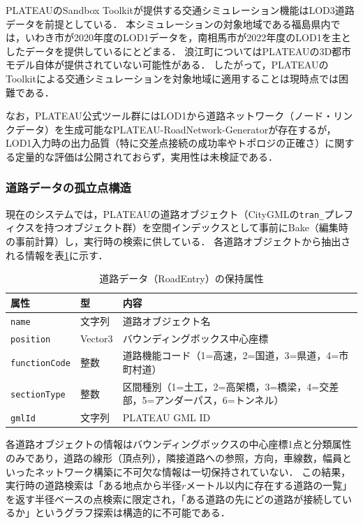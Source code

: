 \documentclass[a4paper,11pt]{jsarticle}
\begin{document}
PLATEAUのSandbox Toolkitが提供する交通シミュレーション機能はLOD3道路データを前提としている\cite{plateautraffic}．
本シミュレーションの対象地域である福島県内では，いわき市が2020年度のLOD1データを，南相馬市が2022年度のLOD1を主としたデータを提供しているにとどまる．
浪江町についてはPLATEAUの3D都市モデル自体が提供されていない可能性がある\cite{plateauportal}．
したがって，PLATEAUのToolkitによる交通シミュレーションを対象地域に適用することは現時点では困難である．

なお，PLATEAU公式ツール群にはLOD1から道路ネットワーク（ノード・リンクデータ）を生成可能なPLATEAU-RoadNetwork-Generator\cite{roadnetgen}が存在するが，LOD1入力時の出力品質（特に交差点接続の成功率やトポロジの正確さ）に関する定量的な評価は公開されておらず，実用性は未検証である．

\subsubsection{道路データの孤立点構造}

現在のシステムでは，PLATEAUの道路オブジェクト（CityGMLの\texttt{tran\_}プレフィクスを持つオブジェクト群）を空間インデックスとして事前にBake（編集時の事前計算）し，実行時の検索に供している．
各道路オブジェクトから抽出される情報を表\ref{tab:roadentry}に示す．

\begin{table}[htbp]
\centering
\caption{道路データ（RoadEntry）の保持属性}
\label{tab:roadentry}
\begin{tabularx}{\textwidth}{llX}
\toprule
属性 & 型 & 内容 \\
\midrule
\texttt{name} & 文字列 & 道路オブジェクト名 \\
\texttt{position} & Vector3 & バウンディングボックス中心座標 \\
\texttt{functionCode} & 整数 & 道路機能コード（1=高速，2=国道，3=県道，4=市町村道） \\
\texttt{sectionType} & 整数 & 区間種別（1=土工，2=高架橋，3=橋梁，4=交差部，5=アンダーパス，6=トンネル） \\
\texttt{gmlId} & 文字列 & PLATEAU GML ID \\
\bottomrule
\end{tabularx}
\end{table}

各道路オブジェクトの情報はバウンディングボックスの中心座標1点と分類属性のみであり，道路の線形（頂点列），隣接道路への参照，方向，車線数，幅員といったネットワーク構築に不可欠な情報は一切保持されていない．
この結果，実行時の道路検索は「ある地点から半径$r$メートル以内に存在する道路の一覧」を返す半径ベースの点検索に限定され，「ある道路の先にどの道路が接続しているか」というグラフ探索は構造的に不可能である．
\end{document}
